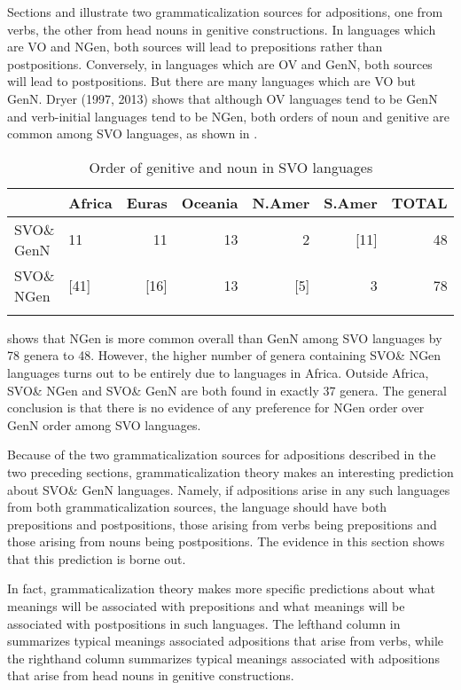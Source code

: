 \documentclass[output=paper]{langsci/langscibook}
\begin{document}
Sections  and  illustrate two grammaticalization sources for adpositions, one from verbs, the other from head nouns in genitive constructions. In languages which are VO and NGen, both sources will lead to prepositions rather than postpositions. Conversely, in languages which are OV and GenN, both sources will lead to postpositions. But there are many languages which are VO but GenN. Dryer (1997, 2013) shows that although OV languages tend to be GenN and verb-initial languages tend to be NGen, both orders of noun and genitive are common among SVO languages, as shown in .

\begin{table}
\begin{tabularx}{\textwidth}{Xlrrrrr} 
\lsptoprule
& \bfseries Africa & \bfseries Euras & \bfseries Oceania & \bfseries N.Amer & \bfseries S.Amer & \bfseries TOTAL\\
\midrule
SVO\& GenN & 11 & 11 & 13 & 2 & [11] & 48\\
SVO\& NGen & [41] & [16] & 13 & [5] & 3 & 78\\
\lspbottomrule
\end{tabularx}
\caption{\label{tab:dryer:5}Order of genitive and noun in SVO languages}
\end{table}


 shows that NGen is more common overall than GenN among SVO languages by 78 genera to 48. However, the higher number of genera containing SVO\& NGen languages turns out to be entirely due to languages in Africa. Outside Africa, SVO\& NGen and SVO\& GenN are both found in exactly 37 genera. The general conclusion is that there is no evidence of any preference for NGen order over GenN order among SVO languages.

Because of the two grammaticalization sources for adpositions described in the two preceding sections, grammaticalization theory makes an interesting prediction about SVO\& GenN languages. Namely, if adpositions arise in any such languages from both grammaticalization sources, the language should have both prepositions and postpositions, those arising from verbs being prepositions and those arising from nouns being postpositions. The evidence in this section shows that this prediction is borne out.

In fact, grammaticalization theory makes more specific predictions about what meanings will be associated with prepositions and what meanings will be associated with postpositions in such languages. The lefthand column in  summarizes typical meanings associated adpositions that arise from verbs, while the righthand column summarizes typical meanings associated with adpositions that arise from head nouns in genitive constructions.
\end{document}
